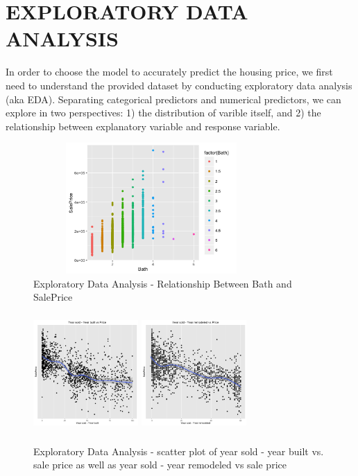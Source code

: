 \documentclass[letterpaper, 10 pt, conference]{ieeeconf}\usepackage[]{graphicx}\usepackage[]{color}
\begin{document}
\section{EXPLORATORY DATA ANALYSIS}
In order to choose the model to accurately predict the housing price, we first need to understand the provided dataset by conducting exploratory data analysis (aka EDA). Separating categorical predictors and numerical predictors, we can explore in two perspectives: 1) the distribution of varible itself, and 2) the relationship between explanatory variable and response variable. 
   \begin{figure}[thpb]
      \centering
      \includegraphics[width =  9cm, height = 5cm]{../images/eda-bath-vs-sale.png}
      \caption{Exploratory Data Analysis - Relationship Between Bath and SalePrice}
      \label{figurelabel}
   \end{figure}
   
   \begin{figure}[thpb]
      \centering
      \includegraphics[width =  4cm, height = 4.5cm]{../images/scatter_Year_sold_Year_built_Vs_Price.png}
      \includegraphics[width =  4cm, height = 4.5cm]{../images/scatter_Year_sold_Year_remodeled_Vs_Price.png}
      \caption{Exploratory Data Analysis - scatter plot of year sold - year built vs. sale price as well as year sold - year remodeled vs sale price}
      \label{figurelabel}
   \end{figure}
   
\end{document}
